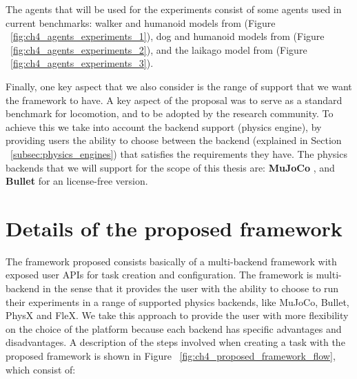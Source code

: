 The agents that will be used for the experiments consist of some agents used in current
benchmarks: walker and humanoid models from \cite{Controlsuite} (Figure ~\ref{fig:ch4_agents_experiments_1}), 
dog and humanoid models from \cite{TerrainRLSim} (Figure ~\ref{fig:ch4_agents_experiments_2}), 
and the laikago model from \cite{PyBullet} (Figure ~\ref{fig:ch4_agents_experiments_3}).

\figAgentsExperimentsOne

\figAgentsExperimentsTwo

\figAgentsExperimentsThree

Finally, one key aspect that we also consider is the range of support that we want the
framework to have. A key aspect of the proposal was to serve as a standard benchmark
for locomotion, and to be adopted by the research community. To achieve this we take
into account the backend support (physics engine), by providing users the ability
to choose between the backend (explained in Section ~\ref{subsec:physics_engines}) 
that satisfies the requirements they have. The physics backends that we will support
for the scope of this thesis are: \textbf{MuJoCo} \citep{MuJoCo}, and \textbf{Bullet} 
\citep{Bullet} for an license-free version.

\section{Details of the proposed framework}

The framework proposed consists basically of a multi-backend framework with exposed user APIs 
for task creation and configuration. The framework is multi-backend
in the sense that it provides the user with the ability to choose to run their experiments
in a range of supported physics backends, like MuJoCo, Bullet, PhysX and FleX. We take
this approach to provide the user with more flexibility on the choice of the platform because
each backend has specific advantages and disadvantages. A description of the steps involved 
when creating a task with the proposed framework is shown in Figure ~\ref{fig:ch4_proposed_framework_flow}, 
which consist of:

